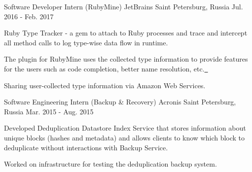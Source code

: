 \begin{cventries}
  \cventry
    {Software Developer Intern (RubyMine)} %
    {JetBrains} %
    {Saint Petersburg, Russia} %
    {Jul. 2016 - Feb. 2017} %
    {
      \begin{cvitems} %
        \item {Ruby Type Tracker - a gem to attach to Ruby processes and trace and intercept all method calls to log type-wise data flow in runtime.}
        \item {The plugin for RubyMine uses the collected type information to provide features for the users such as code completion, better name resolution, etc.\href{https://github.com/JetBrains/intellij-arend}{\ \faGithub}}
        \item {Sharing user-collected type information via Amazon Web Services.}
      \end{cvitems}
    }

  \cventry
    {Software Engineering Intern (Backup \& Recovery)} %
    {Acronis} %
    {Saint Petersburg, Russia} %
    {Mar. 2015 - Aug. 2015} %
    {
      \begin{cvitems} %
        \item {Developed Deduplication Datastore Index Service that stores information about unique blocks (hashes and metadata) and allows clients to know which block to deduplicate without interactions with Backup Service.}
        \item {Worked on infrastructure for testing the deduplication backup system.}
      \end{cvitems}
    }

\end{cventries}
